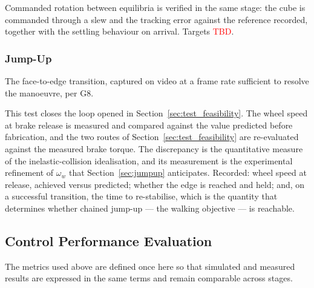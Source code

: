 \label{sec:test_slew}
Commanded rotation between equilibria is verified in the same stage: the cube is
commanded through a slew and the tracking error against the reference recorded,
together with the settling behaviour on arrival. Targets \textcolor{red}{TBD}.

\subsubsection{Jump-Up}
\label{sec:test_jumpup}

The face-to-edge transition, captured on video at a frame rate sufficient to
resolve the manoeuvre, per G8.

This test closes the loop opened in Section~\ref{sec:test_feasibility}. The wheel
speed at brake release is measured and compared against the value predicted
before fabrication, and the two routes of Section~\ref{sec:test_feasibility} are
re-evaluated against the measured brake torque. The discrepancy is the
quantitative measure of the inelastic-collision idealisation, and its measurement
is the experimental refinement of $\omega_w$ that Section~\ref{sec:jumpup}
anticipates. Recorded: wheel speed at release, achieved versus predicted; whether
the edge is reached and held; and, on a successful transition, the time to
re-stabilise, which is the quantity that determines whether chained jump-up ---
the walking objective --- is reachable.

\subsection{Control Performance Evaluation}
\label{sec:test_perf}

The metrics used above are defined once here so that simulated and measured
results are expressed in the same terms and remain comparable across stages.

